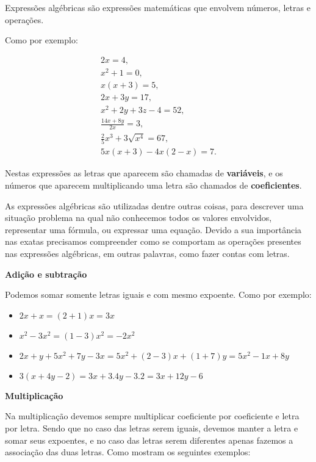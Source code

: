  Expressões algébricas são expressões matemáticas que envolvem números, letras e operações.

 Como por exemplo:

 \begin{eqnarray*}
  2x=4,\\
  x^2+1=0,\\
  x(x+3)=5,\\
  2x+3y=17,\\
  x^2 + 2y + 3z -4= 52, \\
  \frac{14x + 8y}{2x}= 3, \\
  \frac{2}{5}x^3 + 3\sqrt{x^4}= 67, \\
  5x(x+3)-4x(2-x)=7.
 \end{eqnarray*}

 Nestas expressões as letras que aparecem são chamadas de \textbf{variáveis}, e os números que aparecem multiplicando uma letra são chamados de \textbf{coeficientes}.

 As expressões algébricas são utilizadas dentre outras coisas, para descrever uma situação problema na qual não conhecemos todos os valores envolvidos, representar uma fórmula, ou expressar uma equação. Devido a sua importância nas exatas precisamos compreender como se comportam as operações presentes nas expressões algébricas, em outras palavras, como fazer contas com letras.

 \vskip0.3cm

 \textbf{Adição e subtração}

 Podemos somar somente letras iguais e com mesmo expoente. Como por exemplo:

 \begin{itemize}
  \item $2x + x= (2+1)x= 3x$
  \item $x^2 - 3x^2= (1-3)x^2= -2x^2$
  \item $2x + y + 5x^2 + 7y - 3x= 5x^2 + (2-3)x + (1+7)y= 5x^2 - 1x + 8y$
  \item $3(x+ 4y-2)= 3x + 3.4y - 3.2= 3x + 12y - 6$
 \end{itemize}

  \vskip0.3cm

 \textbf{Multiplicação}

 Na multiplicação devemos sempre multiplicar coeficiente por coeficiente e letra por letra. Sendo que no caso das letras serem iguais, devemos manter a letra e somar seus expoentes, e no caso das letras serem diferentes apenas fazemos a associação das duas letras. Como mostram os seguintes exemplos:

